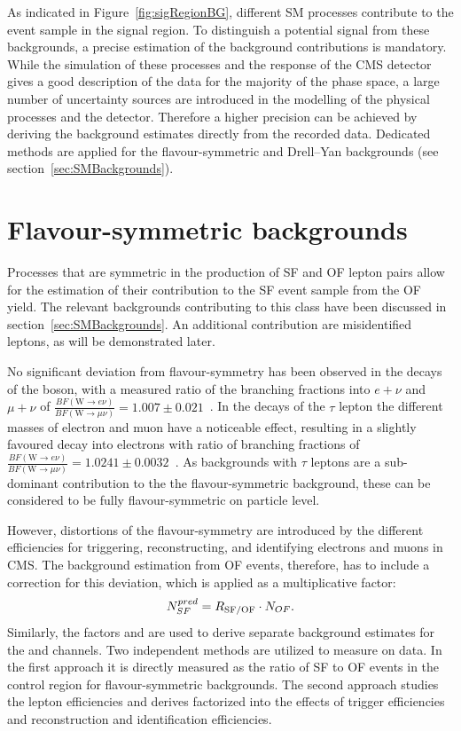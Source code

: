 \label{sec:backgrounds}
As indicated in Figure~\ref{fig:sigRegionBG}, different SM processes contribute to the event sample in the signal region. To distinguish a potential signal from these backgrounds, a precise estimation of the background contributions is mandatory. While the simulation of these processes and the response of the CMS detector gives a good description of the data for the majority of the phase space, a large number of uncertainty sources are introduced in the modelling of the physical processes and the detector. Therefore a higher precision can be achieved by deriving the background estimates directly from the recorded data. Dedicated methods are applied for the flavour-symmetric and Drell--Yan backgrounds (see section~\ref{sec:SMBackgrounds}).

\section{Flavour-symmetric backgrounds}
Processes that are symmetric in the production of SF and OF lepton pairs allow for the estimation of their contribution to the SF event sample from the OF yield. The relevant backgrounds contributing to this class have been discussed in section~\ref{sec:SMBackgrounds}. An additional contribution are misidentified leptons, as will be demonstrated later. 

No significant deviation from flavour-symmetry has been observed in the decays of the \W boson, with a measured ratio of the branching fractions into $e+\nu$ and $\mu + \nu$ of $\frac{BF(\text{W}\rightarrow e\nu)}{BF(\text{W}\rightarrow \mu\nu)} = 1.007\pm0.021$~\cite{PDG}. In the decays of the $\tau$ lepton the different masses of electron and muon have a noticeable effect, resulting in a slightly favoured decay into electrons with ratio of branching fractions of  $\frac{BF(\text{W}\rightarrow e\nu)}{BF(\text{W}\rightarrow \mu\nu)} = 1.0241\pm0.0032$~\cite{PDG}. As backgrounds with $\tau$ leptons are a sub-dominant contribution to the the flavour-symmetric background, these can be considered to be fully flavour-symmetric on particle level. 

However, distortions of the flavour-symmetry are introduced by the different efficiencies for triggering, reconstructing, and identifying electrons and muons in CMS. The background estimation from OF events, therefore, has to include a correction for this deviation, which is applied as a multiplicative factor:
\begin{equation}
N_{SF}^{pred} = R_{\text{SF/OF}} \cdot N_{OF}.
\end{equation}
Similarly, the factors \Reeof and \Rmmof are used to derive separate background estimates for the \EE and \MM channels. Two independent methods are utilized to measure \Rsfof on data. In the first approach it is directly measured as the ratio of SF to OF events in the control region for flavour-symmetric backgrounds. The second approach studies the lepton efficiencies and derives \Rsfof factorized into the effects of trigger efficiencies and reconstruction and identification efficiencies.  

